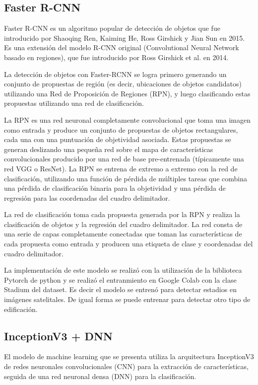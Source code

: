 \documentclass[article]{llncs}
\begin{document}
\subsection{Faster R-CNN}
Faster R-CNN es un algoritmo popular de detección de objetos que fue introducido por Shaoqing Ren, 
Kaiming He, Ross Girshick y Jian Sun en 2015. Es una extensión del modelo R-CNN original (Convolutional Neural 
Network basado en regiones), que fue introducido por Ross Girshick et al. en 2014.

La detección de objetos con Faster-RCNN se logra primero generando un conjunto de propuestas de región 
(es decir, ubicaciones de objetos candidatos) utilizando una Red de Proposición de Regiones (RPN), y luego 
clasificando estas propuestas utilizando una red de clasificación.

La RPN es una red neuronal completamente convolucional que toma una imagen como entrada y produce un conjunto de 
propuestas de objetos rectangulares, cada una con una puntuación de objetividad asociada. Estas propuestas se generan 
deslizando una pequeña red sobre el mapa de características convolucionales producido por una red de base pre-entrenada 
(típicamente una red VGG o ResNet). La RPN se entrena de extremo a extremo con la red de clasificación, utilizando una 
función de pérdida de múltiples tareas que combina una pérdida de clasificación binaria para la objetividad y una 
pérdida de regresión para las coordenadas del cuadro delimitador.

La red de clasificación toma cada propuesta generada por la RPN y realiza la clasificación de objetos y la regresión 
del cuadro delimitador. La red consta de una serie de capas completamente conectadas que toman las características de 
cada propuesta como entrada y producen una etiqueta de clase y coordenadas del cuadro delimitador.

La implementaci\'on de este modelo se realiz\'o con la utilizaci\'on de la biblioteca Pytorch de python y se realiz\'o el
entranmiento en Google Colab con la clase Stadium del dataset. Es decir el modelo se entren\'o para detectar estadios en 
im\'agenes satelitales. De igual forma se puede entrenar para detectar otro tipo de edificaci\'on.

\subsection{InceptionV3 + DNN}

El modelo de machine learning que se presenta utiliza la arquitectura InceptionV3 de redes neuronales convolucionales 
(CNN) para la extracción de características, seguida de una red neuronal densa (DNN) para la clasificación.
\end{document}
